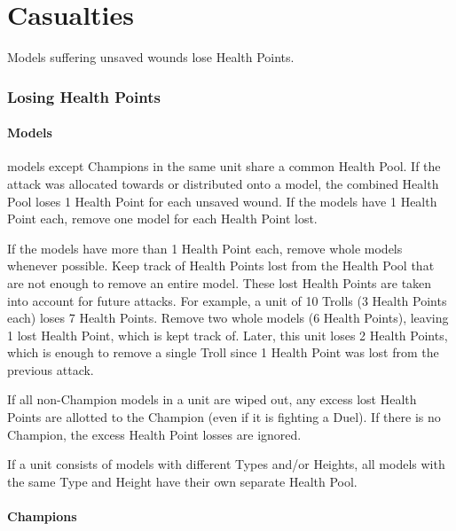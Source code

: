 
\part{Casualties}
\label{casualties}

Models suffering unsaved wounds lose Health Points.

\RBbmc

\section{Losing Health Points}
\label{losing_health_points}

\subsection{\rnf{} Models}

\rnf{} models except Champions in the same unit share a common Health Pool. If the attack was allocated towards or distributed onto a \rnf{} model, the combined \rnf{} Health Pool loses 1 Health Point for each unsaved wound. If the \rnf{} models have 1 Health Point each, remove one \rnf{} model for each Health Point lost.

If the \rnf{} models have more than 1 Health Point each, remove whole \rnf{} models whenever possible. Keep track of Health Points lost from the Health Pool that are not enough to remove an entire model. These lost Health Points are taken into account for future attacks. For example, a unit of 10 Trolls (3 Health Points each) loses 7 Health Points. Remove two whole models (6 Health Points), leaving 1 lost Health Point, which is kept track of. Later, this unit loses 2 Health Points, which is enough to remove a single Troll since 1 Health Point was lost from the previous attack.

If all non-Champion \rnf{} models in a unit are wiped out, any excess lost Health Points are allotted to the Champion (even if it is fighting a Duel). If there is no Champion, the excess Health Point losses are ignored.

If a unit consists of \rnf{} models with different Types and/or Heights, all \rnf{} models with the same Type and Height have their own separate Health Pool.

\subsection{Champions}


